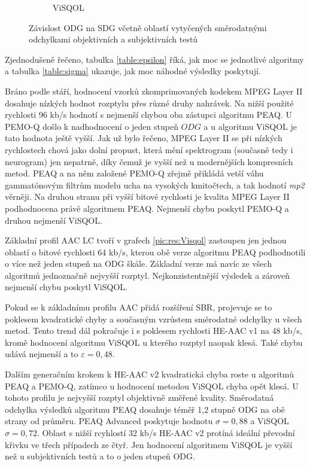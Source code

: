 \begin{figure}[h!]
\begin{subfigure}{.5\textwidth}
        \caption{ViSQOL}
        \label{fig:comapre:visqol}
    \end{subfigure}%
    \caption{Závislost ODG na SDG včetně oblastí vytyčených směrodatnými odchylkami objektivních a subjektivních testů}
    \label{fig:compare}
\end{figure}

Zjednodušeně řečeno, tabulka \ref{table:epsilon} říká, jak moc se jednotlivé algoritmy  a tabulka \ref{table:sigma} ukazuje, jak moc náhodné výsledky poskytují.

Bráno podle stáří, hodnocení vzorků zkomprimovaných kodekem MPEG Layer II dosahuje nízkých hodnot rozptylu přes různé druhy nahrávek. Na nižší použité rychlosti 96 kb/s hodnotí s nejmenší chybou oba zástupci algoritmu PEAQ. U PEMO-Q došlo k nadhodnocení o jeden stupeň $ODG$ a u algoritmu ViSQOL je tato hodnota ještě vyšší. Jak už bylo řečeno, MPEG Layer II se při nízkých rychlostech chová jako dolní propust, která mění spektrogram (současně tedy i neurogram) jen nepatrně, díky čemuž je  vyšší než u modernějších kompresních metod. PEAQ a na něm založené PEMO-Q zřejmě přikládá vetší váhu gammatónovým filtrům modelu ucha na vysokých kmitočtech, a tak hodnotí \textit{mp2} věrněji. Na druhou stranu při vyšší bitové rychlosti je kvalita MPEG Layer II podhodnocena právě algoritmem PEAQ. Nejmenší chybu poskytl PEMO-Q a druhou nejmenší ViSQOL.

Základní profil AAC LC tvoří v grafech \ref{pic:res:Visqol} zastoupen jen jednou oblastí o bitové rychlosti 64 kb/s, kterou obě verze algoritmu PEAQ podhodnotili o více než jeden stupeň na ODG škále. Základní verze má navíc ze všech algoritmů jednoznačně nejvyšší rozptyl. Nejkonzistentnější výsledek a zároveň nejmenší chybu poskytl ViSQOL. 

Pokud se k základnímu profilu AAC přidá rozšíření SBR, projevuje se to poklesem kvadratické chyby a současným vzrůstem směrodatné odchylky u všech metod. Tento trend dál pokračuje i s poklesem rychlosti HE-AAC v1 na 48 kb/s, kromě hodnocení algoritmu ViSQOL u kterého rozptyl naopak klesá. Také chybu udává nejmenší a to $\varepsilon = 0,48$.

Dalším generačním krokem k HE-AAC v2 kvadratická chyba roste u algoritmů PEAQ a PEMO-Q, zatímco u hodnocení metodou ViSQOL chyba opět klesá. U tohoto profilu je nejvyšší rozptyl objektivně změřené kvality. Směrodatná odchylka výsledků algoritmu PEAQ dosahuje téměř 1,2 stupně ODG na obě strany od průměru. PEAQ Advanced poskytuje hodnotu $\sigma = 0,88$ a ViSQOL $\sigma = 0,72$. Oblast s nižší rcyhlostí 32 kb/s HE-AAC v2 protíná ideální převodní křivku ve třech případech ze čtyř. Jen hodnocení algoritmem ViSQOL je vyšší než u subjektivních testů a to o jeden stupeň ODG.

